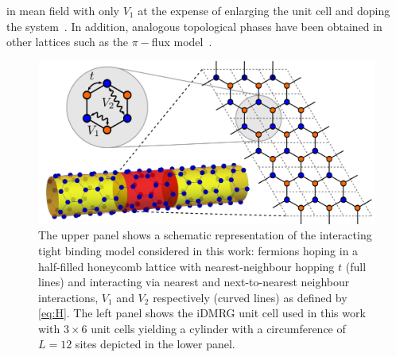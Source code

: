 \documentclass[aps,prx,10pt,twocolumn,floatfix,superscriptaddress,showpacs,numerical,footinbib]{revtex4-1}
\begin{document}
in mean field with only $V_{1}$ at the expense of enlarging the unit cell and doping the system~\cite{CGV11,GCC13}.
%
In addition, analogous topological phases have been obtained in other lattices such as the $\pi-$flux model~\cite{WF10,JGC13}.
%
\begin{figure}
%
 \includegraphics[width=\columnwidth]{pdf/unit_cell.pdf}
 \caption{The upper panel shows a schematic representation of the interacting tight binding model considered in this work:
fermions hoping in a half-filled honeycomb lattice with nearest-neighbour hopping $t$ (full lines) and interacting via
 nearest and next-to-nearest neighbour interactions, $V_{1}$ and $V_{2}$ respectively (curved lines) as defined by 
 \eqref{eq:H}.
 The left panel shows the iDMRG unit cell used in this work with 
 $3 \times 6$ unit cells yielding a cylinder with a circumference of $L=12$ sites depicted in the lower panel. 
 \label{fig:Defs}}
\end{figure}
\\
\end{document}
